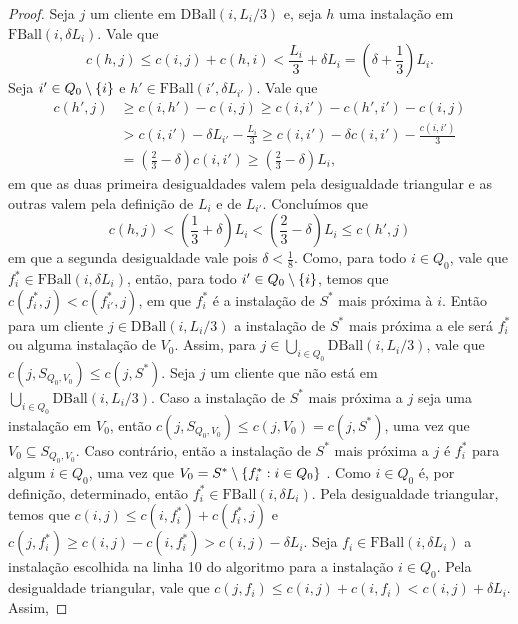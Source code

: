 \begin{proof}

    Seja $j$ um cliente em  $\text{DBall}(i,L_i/3)$ e, seja $h$ uma instalação em $\text{FBall}(i,\delta L_i)$. Vale que 
    \[c(h,j) \leq c(i,j) + c(h,i) < \frac{L_i}{3} + \delta L_i = (\delta + \frac{1}{3}) L_i.\]
        Seja $i' \in Q_0 \setminus \{i\}$ e $h' \in \text{FBall}(i',\delta L_{i'})$. Vale que 
        \begin{subequations}
            \begin{align*}
                c(h',j) &\geq c(i,h') - c(i,j) \geq c(i,i') - c(h',i') - c(i,j) \\
                &> c(i,i') - \delta L_{i'} - \frac{L_i}{3} \geq c(i,i') - \delta c(i,i') - \frac{c(i,i')}{3} \\
                &= \left(\frac{2}{3} - \delta\right) c(i,i') \geq \left(\frac{2}{3} - \delta \right) L_i,
            \end{align*}
        \end{subequations}
        em que as duas primeira desigualdades valem pela desigualdade triangular e as outras valem pela definição de $L_i$ e de $L_{i'}$. Concluímos que
        \[c(h,j) < \left( \frac{1}{3} + \delta  \right) L_i < \left(\frac{2}{3} - \delta\right) L_i \leq c(h',j)\]
        em que a segunda desigualdade vale pois $\delta < \frac{1}{8}$. Como, para todo $i\in Q_0$, vale que $f_{i}^* \in \text{FBall}(i,\delta L_i)$, então, para todo $i' \in Q_0 \setminus \{i\}$, temos que $c(f_{i}^*,j) < c(f_{i'}^*,j)$, em que $f_i^*$ é a instalação de $S^*$ mais próxima à $i$. Então para um cliente $j \in \text{DBall}(i,L_i/3)$ a instalação de $S^*$ mais próxima a ele será $f_i^*$ ou alguma instalação de $V_0$. Assim, para $j \in \bigcup_{i \in Q_0} \text{DBall}(i,L_i/3)$, vale que ${c(j, S_{Q_0,V_0}) \leq c(j,S^*)}$. Seja $j$ um cliente que não está em $\bigcup_{i \in Q_0} \text{DBall}(i,L_i/3)$. Caso a instalação de $S^*$ mais próxima a $j$ seja uma instalação em $V_0$, então ${c(j,S_{Q_0,V_0}) \leq c(j,V_0) = c(j,S^*)}$, uma vez que $V_0 \subseteq S_{Q_0,V_0}$. Caso contrário, então a instalação de $S^*$ mais próxima a $j$ é $f_i^*$ para algum $i \in Q_0$, uma vez que ${V_0 = S^* \setminus \{f_i^* : i \in Q_0\}}$ . Como $i \in Q_0$ é, por definição, determinado, então $f_i^* \in \text{FBall}(i,\delta L_i)$. Pela desigualdade triangular, temos que ${c(i,j) \leq c(i,f_i^*) + c(f_i^*,j)}$ e ${c(j,f_i^*) \geq c(i,j) - c(i,f_i^*) > c(i,j) - \delta L_i}$. Seja $f_i \in \text{FBall}(i,\delta L_i)$ a instalação escolhida na linha 10 do algoritmo para a instalação $i \in Q_0$. Pela desigualdade triangular, vale que ${c(j,f_i) \leq c(i,j) + c(i,f_i) < c(i,j) + \delta L_i}$. Assim, 

\end{proof}

